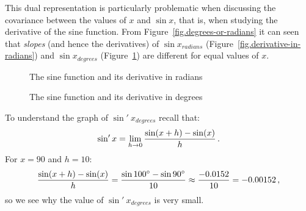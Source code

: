 This dual representation is particularly problematic when discussing the covariance between the values of $x$ and $\sin x$, that is, when studying the derivative of the sine function.
From Figure~\ref{fig.degrees-or-radians} it can seen that \emph{slopes} (and hence the derivatives) of $\sin x_{\scriptstyle \textit{radians}}$ (Figure~\ref{fig.derivative-in-radians}) and $\sin x_{\scriptstyle \textit{degrees}}$ (Figure~\ref{fig.derivative-in-degrees}) are different for equal values of $x$. 

\begin{figure}[htb]
\begin{center}
\caption{The sine function and its derivative in radians}\label{fig.derivative-in-radians}
\end{center}

\begin{center}
\caption{The sine function and its derivative in degrees}\label{fig.derivative-in-degrees}
\end{center}
\end{figure}

To understand the graph of $\sin'\: x_{\scriptstyle degrees}$ recall that:
\[
\sin' x=\lim_{h\rightarrow 0} \displaystyle\frac{\sin(x+h)-\sin(x)}{h}\,.
\]
For $x=90$ and $h=10$:
\[
\displaystyle\frac{\sin(x+h)-\sin(x)}{h} = \displaystyle\frac{\sin 100^\circ-\sin 90^\circ}{10}\approx \displaystyle\frac{-0.0152}{10}=-0.00152\,,
\]
so we see why the value of $\sin'\: x_{\scriptstyle degrees}$ is very small.

